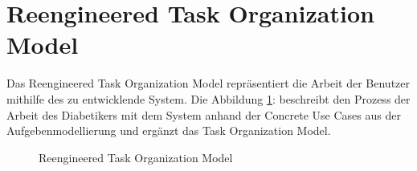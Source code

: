 \section{Reengineered Task Organization Model}
Das Reengineered Task Organization Model repräsentiert die Arbeit der Benutzer mithilfe des zu entwicklende System. Die Abbildung \ref{img:reengineeredTaskOrganizationModel}:  beschreibt den Prozess der Arbeit des Diabetikers mit dem System anhand der Concrete Use Cases aus der Aufgebenmodellierung und ergänzt das Task Organization Model.
\begin{figure}[H]
	\centering
	\setlength{\fboxsep}{1pt}
	\setlength{\fboxrule}{1pt}
	\captionsetup{justification=centering}
	\caption{Reengineered Task Organization Model}
	\label{img:reengineeredTaskOrganizationModel}
\end{figure}